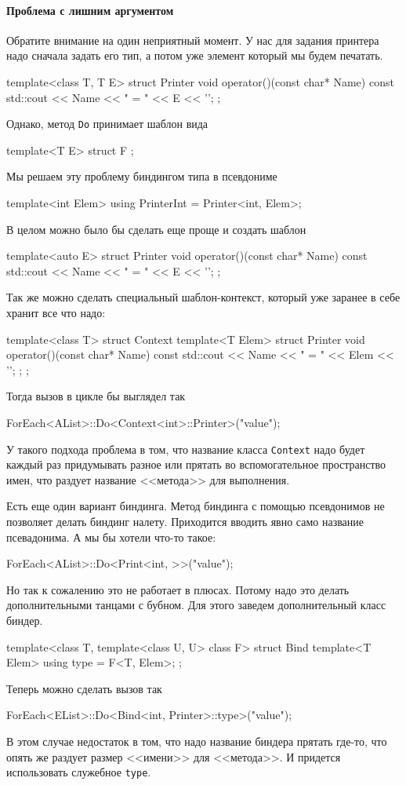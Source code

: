 \paragraph{Проблема с лишним аргументом}

Обратите внимание на один неприятный момент.
У нас для задания принтера надо сначала задать его тип, а потом уже элемент который мы будем печатать.
\begin{cppcode}
template<class T, T E>
struct Printer {
  void operator()(const char* Name) const {
    std::cout << Name << " = " << E << '\n';
  }
};
\end{cppcode}
Однако, метод \verb"Do" принимает шаблон вида
\begin{cppcode}
template<T E>
struct F {};
\end{cppcode}
Мы решаем эту проблему биндингом типа в псевдониме
\begin{cppcode}
template<int Elem>
using PrinterInt = Printer<int, Elem>;
\end{cppcode}
В целом можно было бы сделать еще проще и создать шаблон
\begin{cppcode}
template<auto E>
struct Printer {
  void operator()(const char* Name) const {
    std::cout << Name << " = " << E << '\n';
  }
};
\end{cppcode}
Так же можно сделать специальный шаблон-контекст, который уже заранее в себе хранит все что надо:
\begin{cppcode}
template<class T>
struct Context {
  template<T Elem>
  struct Printer {
    void operator()(const char* Name) const {
      std::cout << Name << " = " << Elem << '\n';
    }
  };
};
\end{cppcode}
Тогда вызов в цикле бы выглядел так
\begin{cppcode}
ForEach<AList>::Do<Context<int>::Printer>("value");
\end{cppcode}
У такого подхода проблема в том, что название класса \verb"Context" надо будет каждый раз придумывать разное или прятать во вспомогательное пространство имен, что раздует название <<метода>> для выполнения.

Есть еще один вариант биндинга.
Метод биндинга с помощью псевдонимов не позволяет делать биндинг налету.
Приходится вводить явно само название псевадонима.
А мы бы хотели что-то такое:
\begin{cppcode}
ForEach<AList>::Do<Print<int, >>("value");
\end{cppcode}
Но так к сожалению это не работает в плюсах.
Потому надо это делать дополнительными танцами с бубном.
Для этого заведем дополнительный класс биндер.
\begin{cppcode}
template<class T, template<class U, U> class F>
struct Bind {
  template<T Elem>
  using type = F<T, Elem>;
};
\end{cppcode}
Теперь можно сделать вызов так
\begin{cppcode}
ForEach<EList>::Do<Bind<int, Printer>::type>("value");
\end{cppcode}
В этом случае недостаток в том, что надо название биндера прятать где-то, что опять же раздует размер <<имени>> для <<метода>>.
И придется использовать служебное \verb"type".


